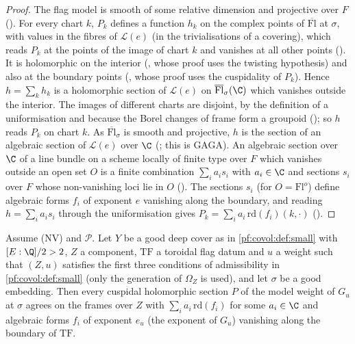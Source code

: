 \begin{proof}
The flag model is smooth of some relative dimension and projective over $F$
(). For every chart $k$, $P_k$ defines a function
$h_k$ on the complex points of $\overline{\mathrm{Fl}}$ at $\sigma$, with values in the fibres of
$\mathcal L(e)$ (in the trivialisations of a covering), which reads $P_k$ at the points of the image of
chart $k$ and vanishes at all other points
(). It is holomorphic on the interior
(, whose proof uses the twisting
hypothesis) and also at the boundary points
(, whose proof uses the cuspidality of
$P_k$). Hence $h=\sum_kh_k$ is a holomorphic
section of $\mathcal L(e)$ on $\overline{\mathrm{Fl}}_\sigma(\C)$ which vanishes outside the interior. The
images of different charts are disjoint, by the definition of a uniformisation and because the Borel
changes of frame form a groupoid (); so $h$ reads
$P_k$ on chart $k$. As
$\overline{\mathrm{Fl}}_\sigma$ is smooth and projective, $h$ is the section of an algebraic section of
$\mathcal L(e)$ over $\C$ (; this is GAGA). An algebraic section
over $\C$ of a line bundle on a scheme locally of finite type over $F$ which vanishes outside an open set $O$
is a finite combination $\sum_ia_is_i$ with $a_i\in\C$ and sections $s_i$ over $F$ whose non-vanishing loci
lie in $O$ (). The sections $s_i$ (for
$O=\mathrm{Fl}^o$) define algebraic forms $f_i$ of exponent $e$ vanishing along the boundary, and reading
$h=\sum_ia_is_i$ through the uniformisation gives $P_k=\sum_ia_i\,\mathrm{rd}(f_i)(k,\cdot)$
().
\end{proof}

\begin{proposition}\label{pf:covol:prop:lum}
Assume (NV) and $\mathcal P$. Let $Y$ be a good deep cover as in \cref{pf:covol:def:small} with
$[E:\Q]/2>2$, $Z$ a component, $\mathrm{TF}$ a toroidal flag datum and $u$ a weight such that
$(Z,u)$ satisfies the first three conditions of admissibility in \cref{pf:covol:def:small} (only the
generation of $\Omega_Z$ is used), and let $\sigma$ be a good embedding. Then every cuspidal holomorphic
section $P$ of the model weight of $G_u$ at $\sigma$ agrees on the frames over $Z$ with $\sum_ia_i\,\mathrm{rd}(f_i)$ for some $a_i\in\C$ and algebraic forms $f_i$ of exponent
$e_u$ (the exponent of $G_u$) vanishing along the boundary of $\mathrm{TF}$.
\end{proposition}

